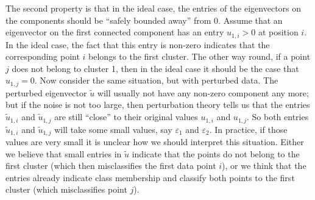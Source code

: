 \documentclass{article}
\newcommand{\eps}{\ensuremath{\varepsilon}}
\begin{document}
The second property is that in the ideal case, the entries of
the eigenvectors on the components should be ``safely bounded away''
from 0.  
Assume that an eigenvector on the first connected component has an
entry $u_{1,i} > 0$ at position $i$. In the ideal case, the fact
that this entry is non-zero indicates that the corresponding point $i$
belongs to the first cluster. The other way round, if a point $j$ does
not belong to cluster 1, then in the ideal case it should be the case
that $u_{1,j}=0$.  Now consider the same situation, but with perturbed
data. The perturbed eigenvector $\tilde u$ will
usually not have any non-zero component any more; but if the noise is
not too large, then perturbation theory tells us that the entries 
$\tilde u_{1,i}$ and $\tilde u_{1,j}$ are still ``close'' to their
original values $u_{1,i}$ and $u_{1,j}$. So both entries $\tilde
u_{1,i}$ and $\tilde u_{1,j}$ will take some small values, say
$\eps_1$ and $\eps_2$. In practice, if those values are very small it is unclear how we
should interpret this situation.  Either we believe that small entries
in $\tilde u$ indicate that the points do not belong to the first
cluster (which then misclassifies the first data point $i$), or we
think that the entries already indicate class membership and classify
both points to the first cluster (which misclassifies point $j$).\\
\end{document}
